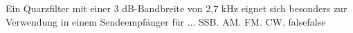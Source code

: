     {Ein Quarzfilter mit einer 3 dB-Bandbreite von 2,7 kHz eignet sich besonders zur Verwendung in einem Sendeempfänger für ...}
    {SSB.}
    {AM.}
    {FM.}
    {CW.}
    {false}{false}